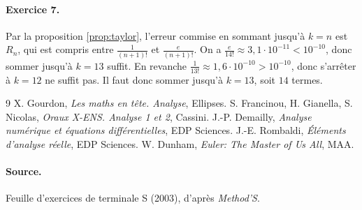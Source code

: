\documentclass[11pt,a4paper]{article}
\theoremstyle{plain}
\theoremstyle{definition}
\theoremstyle{remark}
\begin{document}
\paragraph{Exercice 7.} Par la proposition \ref{prop:taylor}, l'erreur commise en sommant jusqu'à $k=n$ est $R_n$, qui est compris entre $\frac{1}{(n+1)!}$ et $\frac{e}{(n+1)!}$. On a $\frac e{14!}\approx3{,}1\cdot10^{-11}<10^{-10}$, donc sommer jusqu'à $k=13$ suffit. En revanche $\frac1{13!}\approx1{,}6\cdot10^{-10}>10^{-10}$, donc s'arrêter à $k=12$ ne suffit pas. Il faut donc sommer jusqu'à $k=13$, soit $14$ termes.

\begin{thebibliography}{9}
 X. Gourdon, \emph{Les maths en tête. Analyse}, Ellipses.
 S. Francinou, H. Gianella, S. Nicolas, \emph{Oraux X-ENS. Analyse 1 et 2}, Cassini.
 J.-P. Demailly, \emph{Analyse numérique et équations différentielles}, EDP Sciences.
 J.-E. Rombaldi, \emph{Éléments d'analyse réelle}, EDP Sciences.
 W. Dunham, \emph{Euler: The Master of Us All}, MAA.
\end{thebibliography}

\paragraph{Source.} Feuille d'exercices de terminale S (2003), d'après \emph{Method'S}.
\end{document}
